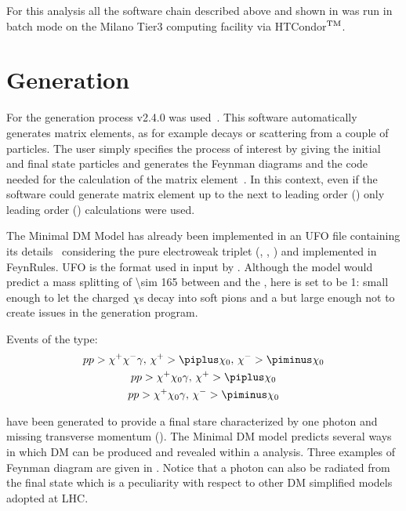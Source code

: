 For this analysis all the software chain described above and shown in \Fig{\ref{fig:chain}} was run in batch mode on the Milano Tier3 computing facility via HTCondor$^{\textup{TM}}$.



\section{Generation}

For the generation process \MGMCatNLO v2.4.0 was used~\cite{madgraph}. This software automatically generates matrix elements, as for example decays or scattering from a couple of particles. The user simply specifies the process of interest by giving the initial and final state particles and \MADGRAPH generates the Feynman diagrams and the code needed for the calculation of the matrix element~\cite{Pottgen:2016807}. In this context, even if the software could generate matrix element up to the next to leading order (\NLO) only leading order (\LO) calculations were used.

The Minimal DM Model has already been implemented in an UFO file containing its details~\cite{mperego} considering the pure electroweak triplet (\chip\!, \chizero\!, \chim\!) and implemented in FeynRules. UFO is the format used in input by \MADGRAPH. Although the model would predict a mass splitting of \SI{\sim 165}{\mev} between \chipm and the \chizero, here is set to be \SI{1}{\gev}: small enough to let the charged $\chi$s decay into soft pions and a \chizero but large enough not to create issues in the generation program. 

Events of the type: 
\begin{gather*}
p p > \chi^+ \chi^- \gamma,\, \chi^+ > \piplus \chi_0,\, \chi^- > \piminus \chi_0\\
p p > \chi^+ \chi_0 \gamma,\, \chi^+ > \piplus \chi_0\\
p p > \chi^+ \chi_0 \gamma,\, \chi^- > \piminus \chi_0
\end{gather*}
 
have been generated to provide a final stare characterized by one photon and missing transverse momentum (\met). The Minimal DM model predicts several ways in which DM can be produced and revealed within a \mph analysis. Three examples of Feynman diagram are given in \Fig{\ref{fig:feynman}}. Notice that a photon can also be radiated from the final state which is a peculiarity with respect to other DM simplified models adopted at LHC.

